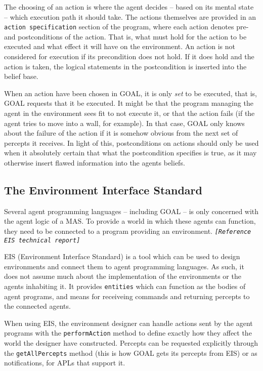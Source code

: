 The choosing of an action is where the agent decides -- based on its
mental state -- which execution path it should take. The actions themselves
are provided in an \texttt{action specification} section of the program,
where each action denotes pre- and postconditions of the action. That
is, what must hold for the action to be executed and what effect it
will have on the environment. An action is not considered for execution
if its precondition does not hold. If it does hold and the action
is taken, the logical statements in the postcondition is inserted
into the belief base. 

When an action have been chosen in GOAL, it is only \emph{set} to
be executed, that is, GOAL requests that it be executed. It might
be that the program managing the agent in the environment sees fit
to not execute it, or that the action fails (if the agent tries to
move into a wall, for example). In that case, GOAL only knows about
the failure of the action if it is somehow obvious from the next set
of percepts it receives. In light of this, postconditions on actions
should only be used when it absolutely certain that what the postcondition
specifies is true, as it may otherwise insert flawed information into
the agents beliefs.


\subsection{The Environment Interface Standard}

Several agent programming languages -- including GOAL -- is only concerned
with the agent logic of a MAS. To provide a world in which these agents
can function, they need to be connected to a program providing an
environment. \texttt{\emph{{[}Reference EIS technical report{]}}}

EIS (Environment Interface Standard) is a tool which can be used to
design environments and connect them to agent programming languages.
As such, it does not assume much about the implementation of the environments
or the agents inhabiting it. It provides \texttt{entities} which can
function as the bodies of agent programs, and means for receiveing
commands and returning percepts to the connected agents.

When using EIS, the environment designer can handle actions sent by
the agent programs with the \texttt{performAction} method to define
exactly how they affect the world the designer have constructed. Percepts
can be requested explicitly through the \texttt{getAllPercepts} method
(this is how GOAL gets its percepts from EIS) or as notifications,
for APLs that support it. 

